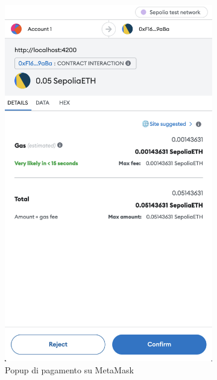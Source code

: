 \begin{figure}[t]
\begin{subfigure}{0.33\textwidth}
    \includegraphics[width=0.9\linewidth]{src/img/checkout_metamask.png}
    \caption{Popup di pagamento su MetaMask}\label{fig:checkout_metamask}
    \end{subfigure}
    \begin{subfigure}{0.33\textwidth}
    \centering

\end{subfigure}
\end{figure}
